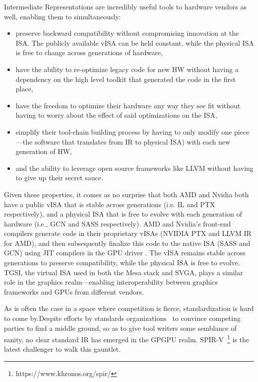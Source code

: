 Intermediate Representations are incredibly useful tools to hardware vendors
as well, enabling them to simultaneously:
\begin{itemize}[nosep, topsep=0em, leftmargin=1em,labelwidth=*,align=left]
\item preserve backward compatibility without compromising innovation at the ISA. The publicly available vISA can be held constant, while the physical ISA is free to change across generations of hardware,
\item have the ability to re-optimize legacy code for new HW without having a dependency on the high level toolkit that generated the code in the first place,
\item have the freedom to optimize their hardware any way they see fit without having to worry about the effect of said optimizations on the ISA,
\item simplify their tool-chain building process by having to only modify one piece---the software that translates from IR to physical ISA) with each new generation of HW,
\item and the ability to leverage open source frameworks like LLVM without having to give up their secret sauce.
\end{itemize}

Given these properties, it comes as no surprise that both AMD and Nvidia both
have a public vISA that is stable across generations (i.e. IL and PTX
respectively), and a physical ISA that is free to evolve with each generation
of hardware (i.e., GCN and SASS respectively). AMD and Nvidia's front-end
compilers generate code in their proprietary vISAs (NVIDIA PTX and LLVM IR for
AMD), and then subsequently finalize this code to the native ISA (SASS and
GCN) using JIT compilers in the GPU driver . The vISA remains stable across
generations to preserve compatibility, while the physical ISA is free to
evolve. TGSI, the virtual ISA used in both the Mesa stack and SVGA, plays a
similar role in the graphics realm---enabling interoperability between graphics frameworks and GPUs from different vendors.

As is often the case in a space where competition is fierce, standardization
is hard to come by.Despite efforts by standards organizations~\cite{Vulkanspec}
to convince competing parties to find a middle ground, so as to give tool
writers some semblance of sanity, no clear standard IR has emerged in the
GPGPU realm. SPIR-V~\footnote{https://www.khronos.org/spir/} is the latest
challenger to walk this gauntlet.

